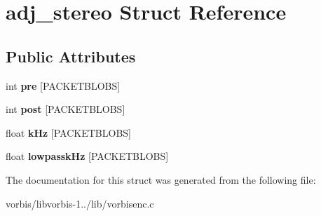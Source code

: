 \hypertarget{structadj__stereo}{\section{adj\+\_\+stereo Struct Reference}
\label{structadj__stereo}
}
\subsection*{Public Attributes}
\begin{DoxyCompactItemize}
\item 
\hypertarget{structadj__stereo_a407eb6cd5c50925e4430031d365f075a}{int {\bfseries pre} \mbox{[}P\+A\+C\+K\+E\+T\+B\+L\+O\+B\+S\mbox{]}}\label{structadj__stereo_a407eb6cd5c50925e4430031d365f075a}

\item 
\hypertarget{structadj__stereo_a4b578638118067c75ffe2768921f1f9e}{int {\bfseries post} \mbox{[}P\+A\+C\+K\+E\+T\+B\+L\+O\+B\+S\mbox{]}}\label{structadj__stereo_a4b578638118067c75ffe2768921f1f9e}

\item 
\hypertarget{structadj__stereo_a13ef814e311be6be34a982e89141f8ed}{float {\bfseries k\+Hz} \mbox{[}P\+A\+C\+K\+E\+T\+B\+L\+O\+B\+S\mbox{]}}\label{structadj__stereo_a13ef814e311be6be34a982e89141f8ed}

\item 
\hypertarget{structadj__stereo_aff4713a11cb5a9d22a61a32f9b20c0d8}{float {\bfseries lowpassk\+Hz} \mbox{[}P\+A\+C\+K\+E\+T\+B\+L\+O\+B\+S\mbox{]}}\label{structadj__stereo_aff4713a11cb5a9d22a61a32f9b20c0d8}

\end{DoxyCompactItemize}


The documentation for this struct was generated from the following file\+:\begin{DoxyCompactItemize}
\item 
vorbis/libvorbis-\/1../lib/vorbisenc.\+c\end{DoxyCompactItemize}
